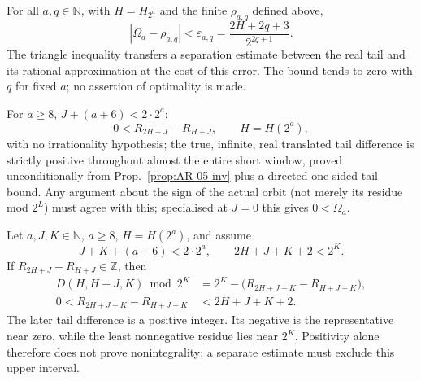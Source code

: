 \begin{prop}\label{prop:SEP-02-inv}
For all $a,q\in\mathbb N$, with $H=H_{2^a}$ and the finite
$\rho_{a,q}$ defined above,
\[
 |\Omega_a-\rho_{a,q}|<\varepsilon_{a,q}
     =\frac{2H+2q+3}{2^{2q+1}}.
\]
The triangle inequality transfers a separation estimate between the
real tail and its rational approximation at the cost of this error.
The bound tends to zero with $q$ for fixed $a$; no assertion of
optimality is made.
\end{prop}

\begin{prop}\label{prop:SGN-01}
For $a\ge8$, $J+(a+6)<2\cdot2^a$:
\[
0 < R_{2H+J} - R_{H+J},\qquad H={H}(2^a),
\]
with no irrationality hypothesis; the true, infinite, real translated tail difference is
strictly positive throughout almost the entire short window, proved unconditionally from
Prop.~\ref{prop:AR-05-inv} plus a directed one-sided tail bound. Any argument about the sign of
the actual orbit (not merely its residue mod $2^L$) must agree with this; specialised at $J=0$
this gives $0<\Omega_a$.
\end{prop}

\begin{prop}\label{prop:SGN-03}
Let $a,J,K\in\mathbb N$, $a\ge8$, $H=H(2^a)$, and assume
\[
 J+K+(a+6)<2\cdot2^a,\qquad 2H+J+K+2<2^K.
\]
If $R_{2H+J}-R_{H+J}\in\mathbb Z$, then
\[
 \begin{aligned}
 D(H,H+J,K)\bmod2^K
   &=2^K-\bigl(R_{2H+J+K}-R_{H+J+K}\bigr),\\
 0<R_{2H+J+K}-R_{H+J+K}&<2H+J+K+2.
 \end{aligned}
\]
The later tail difference is a positive integer. Its negative is the
representative near zero, while the least nonnegative residue lies near
$2^K$. Positivity alone therefore does not prove nonintegrality; a
separate estimate must exclude this upper interval.
\end{prop}


